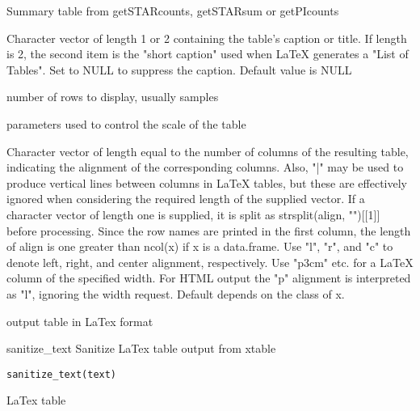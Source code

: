 \documentclass[letterpaper]{book}
\begin{document}
\begin{Arguments}
\begin{ldescription}
\item[\code{tab}] Summary table from getSTARcounts, getSTARsum or getPIcounts

\item[\code{cap}] Character vector of length 1 or 2 containing the table's caption or title. If length is 2, the second item is the "short caption" used when LaTeX generates a "List of Tables". Set to NULL to suppress the caption. Default value is NULL

\item[\code{top}] number of rows to display, usually samples

\item[\code{scale}] parameters used to control the scale of the table

\item[\code{align}] Character vector of length equal to the number of columns of the resulting table, indicating the alignment of the corresponding columns. Also, "|" may be used to produce vertical lines between columns in LaTeX tables, but these are effectively ignored when considering the required length of the supplied vector. If a character vector of length one is supplied, it is split as strsplit(align, "")[[1]] before processing. Since the row names are printed in the first column, the length of align is one greater than ncol(x) if x is a data.frame. Use "l", "r", and "c" to denote left, right, and center alignment, respectively. Use "p3cm" etc. for a LaTeX column of the specified width. For HTML output the "p" alignment is interpreted as "l", ignoring the width request. Default depends on the class of x.
\end{ldescription}
\end{Arguments}
%
\begin{Value}
output table in LaTex format
\end{Value}
%
\begin{Description}\relax
sanitize\_text
Sanitize LaTex table output from xtable
\end{Description}
%
\begin{Usage}
\begin{verbatim}
sanitize_text(text)
\end{verbatim}
\end{Usage}
%
\begin{Arguments}
\begin{ldescription}
\item[\code{text}] LaTex table
\end{ldescription}
\end{Arguments}
\end{document}
